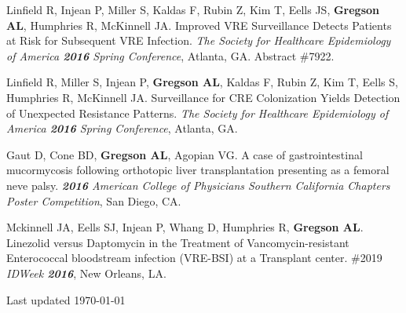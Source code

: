 \documentclass[letterpaper,11pt,sans,final]{/usr/local/share/texmf-dist/tex/latex/moderncv/moderncv}%
\begin{document}
\begin{thebibliography}{1}
\bibitem[17]{} Linfield R, Injean P, Miller S, Kaldas F, Rubin Z, Kim T, Eells JS, \textbf{Gregson AL}, Humphries R, McKinnell JA. Improved VRE Surveillance Detects Patients at Risk for Subsequent VRE Infection. \textit{The Society for Healthcare Epidemiology of America \textbf{2016} Spring Conference}, Atlanta, GA. Abstract \#7922.

\bibitem[18]{} Linfield R, Miller S, Injean P, \textbf{Gregson AL}, Kaldas F, Rubin Z, Kim T, Eells S, Humphries R, McKinnell JA. Surveillance for CRE Colonization Yields Detection of Unexpected Resistance Patterns. \textit{The Society for Healthcare Epidemiology of America \textbf{2016} Spring Conference}, Atlanta, GA.

\bibitem[19]{} Gaut D, Cone BD, \textbf{Gregson AL}, Agopian VG. A case of gastrointestinal mucormycosis following orthotopic liver transplantation presenting as a femoral neve palsy. \textit{\textbf{2016} American College of Physicians Southern California Chapters Poster Competition}, San Diego, CA. 

\bibitem[20]{}  Mckinnell JA, Eells SJ, Injean P, Whang D, Humphries R, \textbf{Gregson AL}. Linezolid versus Daptomycin in the Treatment of Vancomycin-resistant Enterococcal bloodstream infection ({\smaller VRE-BSI}) at a Transplant center. \#2019 \textit{IDWeek \textbf{2016}}, New Orleans, LA. 


\end{thebibliography}

\vfill

Last updated \today
\end{document}
